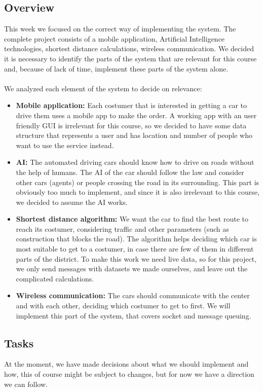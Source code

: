\documentclass[a4paper]{article}
\begin{document}
\subsection*{Overview}
This week we focused on the correct way of implementing the system. The complete project consists of a mobile application, Artificial Intelligence technologies, shortest distance calculations, wireless communication. We decided it is necessary to identify the parts of the system that are relevant for this course and, because of lack of time, implement these parts of the system alone.
\\\\We analyzed each element of the system to decide on relevance:
\begin{itemize}
    \item \textbf{Mobile application:} Each costumer that is interested in getting a car to drive them uses a mobile app to make the order. A working app with an user friendly GUI is irrelevant for this course, so we decided to have some data structure that represents a user and has location and number of people who want to use the service instead.
    \item \textbf{AI:} The automated driving cars should know how to drive on roads without the help of humans. The AI of the car should follow the law and consider other cars (agents) or people crossing the road in its surrounding. This part is obviously too much to implement, and since it is also irrelevant to this course, we decided to assume the AI works.
    \item \textbf{Shortest distance algorithm:} We want the car to find the best route to reach its costumer, considering traffic and other parameters (such as construction that blocks the road). The algorithm helps deciding which car is most suitable to get to a costumer, in case there are few of them in different parts of the district. To make this work we need live data, so for this project, we only send messages with datasets we made ourselves, and leave out the complicated calculations.
    \item \textbf{Wireless communication:} The cars should communicate with the center and with each other, deciding which costumer to get to first. We will implement this part of the system, that covers socket and message queuing.
\end{itemize}

\subsection*{Tasks}
At the moment, we have made decisions about what we should implement and how, this of course might be subject to changes, but for now we have a direction we can follow.
\end{document}
